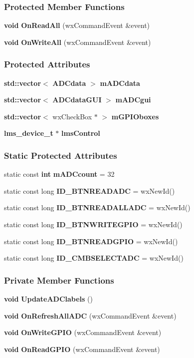 \subsubsection*{Protected Member Functions}
\begin{DoxyCompactItemize}
\item 
{\bf void} {\bf On\+Read\+All} (wx\+Command\+Event \&event)
\item 
{\bf void} {\bf On\+Write\+All} (wx\+Command\+Event \&event)
\end{DoxyCompactItemize}
\subsubsection*{Protected Attributes}
\begin{DoxyCompactItemize}
\item 
{\bf std\+::vector}$<$ {\bf A\+D\+Cdata} $>$ {\bf m\+A\+D\+Cdata}
\item 
{\bf std\+::vector}$<$ {\bf A\+D\+Cdata\+G\+UI} $>$ {\bf m\+A\+D\+Cgui}
\item 
{\bf std\+::vector}$<$ wx\+Check\+Box $\ast$ $>$ {\bf m\+G\+P\+I\+Oboxes}
\item 
{\bf lms\+\_\+device\+\_\+t} $\ast$ {\bf lms\+Control}
\end{DoxyCompactItemize}
\subsubsection*{Static Protected Attributes}
\begin{DoxyCompactItemize}
\item 
static const {\bf int} {\bf m\+A\+D\+Ccount} = 32
\item 
static const long {\bf I\+D\+\_\+\+B\+T\+N\+R\+E\+A\+D\+A\+DC} = wx\+New\+Id()
\item 
static const long {\bf I\+D\+\_\+\+B\+T\+N\+R\+E\+A\+D\+A\+L\+L\+A\+DC} = wx\+New\+Id()
\item 
static const long {\bf I\+D\+\_\+\+B\+T\+N\+W\+R\+I\+T\+E\+G\+P\+IO} = wx\+New\+Id()
\item 
static const long {\bf I\+D\+\_\+\+B\+T\+N\+R\+E\+A\+D\+G\+P\+IO} = wx\+New\+Id()
\item 
static const long {\bf I\+D\+\_\+\+C\+M\+B\+S\+E\+L\+E\+C\+T\+A\+DC} = wx\+New\+Id()
\end{DoxyCompactItemize}
\subsubsection*{Private Member Functions}
\begin{DoxyCompactItemize}
\item 
{\bf void} {\bf Update\+A\+D\+Clabels} ()
\item 
{\bf void} {\bf On\+Refresh\+All\+A\+DC} (wx\+Command\+Event \&event)
\item 
{\bf void} {\bf On\+Write\+G\+P\+IO} (wx\+Command\+Event \&event)
\item 
{\bf void} {\bf On\+Read\+G\+P\+IO} (wx\+Command\+Event \&event)
\end{DoxyCompactItemize}


